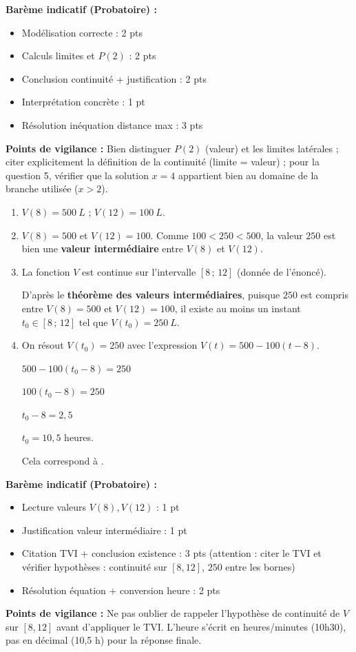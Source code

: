 \documentclass[11pt]{article}
\begin{document}
\begin{corrige}
\textbf{Barème indicatif (Probatoire) :}
\begin{itemize}
\item Modélisation correcte : 2 pts
\item Calculs limites et $P(2)$ : 2 pts
\item Conclusion continuité + justification : 2 pts
\item Interprétation concrète : 1 pt
\item Résolution inéquation distance max : 3 pts
\end{itemize}
\textbf{Points de vigilance :} Bien distinguer $P(2)$ (valeur) et les limites latérales ; citer explicitement la définition de la continuité (limite = valeur) ; pour la question 5, vérifier que la solution $x=4$ appartient bien au domaine de la branche utilisée ($x>2$).
\end{corrige}

\begin{corrige}
\begin{enumerate}
\item $V(8) = \boxed{\SI{500}{L}}$ ; $V(12) = \boxed{\SI{100}{L}}$.
\item $V(8)=500$ et $V(12)=100$. Comme $100 < 250 < 500$, la valeur $250$ est bien une \textbf{valeur intermédiaire} entre $V(8)$ et $V(12)$.
\item La fonction $V$ est continue sur l'intervalle $[8\,;\,12]$ (donnée de l'énoncé). \par
D'après le \textbf{théorème des valeurs intermédiaires}, puisque $250$ est compris entre $V(8)=500$ et $V(12)=100$, il existe au moins un instant $t_0 \in [8\,;\,12]$ tel que $V(t_0) = \SI{250}{L}$.
\item On résout $V(t_0) = 250$ avec l'expression $V(t) = 500 - 100(t-8)$. \par
$500 - 100(t_0-8) = 250$ \par
$100(t_0-8) = 250$ \par
$t_0 - 8 = 2,5$ \par
$t_0 = \boxed{10,5}$ heures. \par
Cela correspond à .
\end{enumerate}

\textbf{Barème indicatif (Probatoire) :}
\begin{itemize}
\item Lecture valeurs $V(8), V(12)$ : 1 pt
\item Justification valeur intermédiaire : 1 pt
\item Citation TVI + conclusion existence : 3 pts (attention : citer le TVI et vérifier hypothèses : continuité sur $[8,12]$, $250$ entre les bornes)
\item Résolution équation + conversion heure : 2 pts
\end{itemize}
\textbf{Points de vigilance :} Ne pas oublier de rappeler l'hypothèse de continuité de $V$ sur $[8,12]$ avant d'appliquer le TVI. L'heure s'écrit en heures/minutes (10h30), pas en décimal (10,5 h) pour la réponse finale.
\end{corrige}
\end{document}
